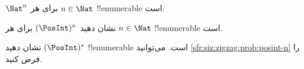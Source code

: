 \documentclass[../../../include/open-logic-section]{subfiles}
\begin{document}
\begin{prop}
$\Nat^n$ برای هر $n \in \Nat$ !!{enumerable} است.
\end{prop}

\begin{prob}\label{sfr:siz:zigzag:prob:posint-n}
نشان دهید $(\PosInt)^n$ برای هر $n \in \Nat$ !!{enumerable} است.
\end{prob}

\begin{prob}\label{sfr:siz:zigzag:prob:posint-star}
  نشان دهید $(\PosInt)^*$ !!{enumerable} است. می‌توانید
  \cref{sfr:siz:zigzag:prob:posint-n} را فرض کنید.
\end{prob}
\end{document}
